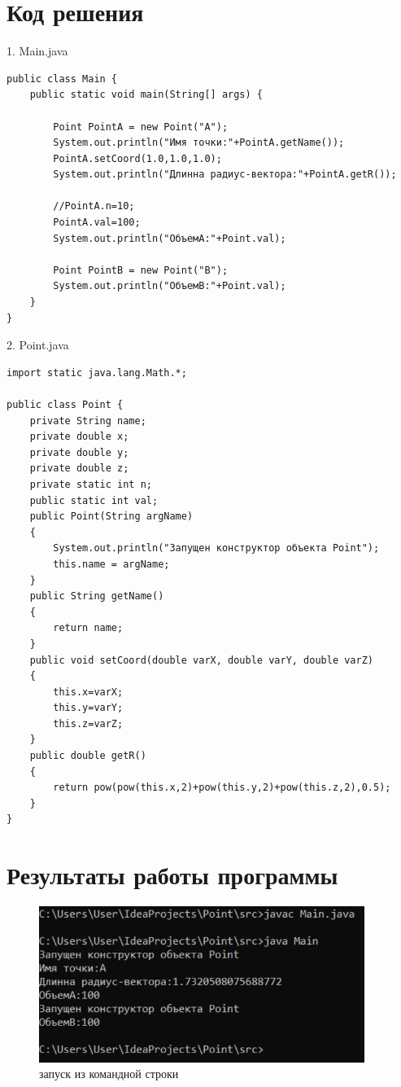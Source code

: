 ﻿\documentclass[a4paper, 12pt]{extarticle}
\begin{document}
\section{Код решения}
1. Main.java
\begin{verbatim}
public class Main {
    public static void main(String[] args) {

        Point PointA = new Point("A");
        System.out.println("Имя точки:"+PointA.getName());
        PointA.setCoord(1.0,1.0,1.0);
        System.out.println("Длинна радиус-вектора:"+PointA.getR());

        //PointA.n=10;
        PointA.val=100;
        System.out.println("ОбъемА:"+Point.val);

        Point PointB = new Point("B");
        System.out.println("ОбъемB:"+Point.val);
    }
}
\end{verbatim}
2. Point.java
\begin{verbatim}
import static java.lang.Math.*;

public class Point {
    private String name;
    private double x;
    private double y;
    private double z;
    private static int n;
    public static int val;
    public Point(String argName)
    {
        System.out.println("Запущен конструктор объекта Point");
        this.name = argName;
    }
    public String getName()
    {
        return name;
    }
    public void setCoord(double varX, double varY, double varZ)
    {
        this.x=varX;
        this.y=varY;
        this.z=varZ;
    }
    public double getR()
    {
        return pow(pow(this.x,2)+pow(this.y,2)+pow(this.z,2),0.5);
    }
}
\end{verbatim}


\section{Результаты работы программы}
\begin{figure}[H]
    \centering
    \includegraphics[width=300pt]{Test.png}
    \caption{запуск из командной строки}
    \label{fig:my_label}
\end{figure}
\end{document}
